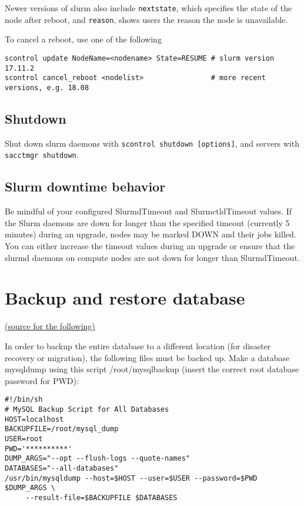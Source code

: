 Newer versions of slurm also include \texttt{nextstate}, which specifies the state of the node after reboot, and \texttt{reason}, shows users the reason the node is unavailable.

To cancel a reboot, use one of the following

\begin{verbatim}
scontrol update NodeName=<nodename> State=RESUME # slurm version 17.11.2
scontrol cancel_reboot <nodelist>                # more recent versions, e.g. 18.08
\end{verbatim}

\subsection{Shutdown} \label{subsec:slurmshutdown}

Shut down slurm daemons with \texttt{scontrol shutdown [options]}, and servers with \texttt{sacctmgr shutdown}.

\subsection{Slurm downtime behavior} \label{subsec:slurmdowntime}
Be mindful of your configured SlurmdTimeout and SlurmctldTimeout values. If the Slurm daemons are down for longer than the specified timeout (currently 5 minutes) during an upgrade, nodes may be marked DOWN and their jobs killed. You can either increase the timeout values during an upgrade or ensure that the slurmd daemons on compute nodes are not down for longer than SlurmdTimeout. 

\section{Backup and restore database} \label{sec:slurmDBbackup}

\href{https://wiki.fysik.dtu.dk/niflheim/Slurm_database#backup-and-restore-of-database}{(source for the following)}

In order to backup the entire database to a different location (for disaster recovery or migration), the following files must be backed up. Make a database mysqldump using this script /root/mysqlbackup (insert the correct root database password for PWD):
\begin{verbatim}
#!/bin/sh
# MySQL Backup Script for All Databases
HOST=localhost
BACKUPFILE=/root/mysql_dump
USER=root
PWD='**********'
DUMP_ARGS="--opt --flush-logs --quote-names"
DATABASES="--all-databases"
/usr/bin/mysqldump --host=$HOST --user=$USER --password=$PWD $DUMP_ARGS \
     --result-file=$BACKUPFILE $DATABASES
\end{verbatim}

